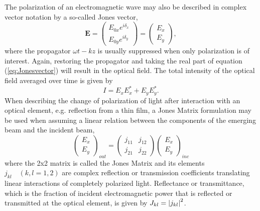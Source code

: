 The polarization of an electromagnetic wave may also be described in complex vector notation by a so-called Jones vector, 
\begin{equation}
    \mathbf{E} = 
    \begin{pmatrix}
        E_{0x}e^{i\delta_x} \\
        E_{0y}e^{i\delta_y} 
    \end{pmatrix}
    =
    \begin{pmatrix}
        E_{x} \\
        E_{y} 
    \end{pmatrix},
    \label{eq:Jonesvector}
\end{equation}
where the propagator $\omega t - kz$ is usually suppressed when only polarization is of interest\cite{collett}. Again, restoring the propagator and taking the real part of equation (\ref{eq:Jonesvector}) will result in the optical field. The total intensity of the optical field averaged over time is given by
\begin{equation}
    I = E_xE_x^* + E_yE_y^*.
\end{equation}
When describing the change of polarization of light after interaction with an optical element, e.g. reflection from a thin film, a Jones Matrix formulation may be used when assuming a linear relation between the components of the emerging beam and the incident beam,
\begin{equation}
    \begin{pmatrix}
        E_{x} \\
        E_{y} 
    \end{pmatrix}_{out}
    =
    \begin{pmatrix}
        j_{11} & j_{12} \\
        j_{21} & j_{22} 
    \end{pmatrix}
    \begin{pmatrix}
        E_{x} \\
        E_{y} 
    \end{pmatrix}_{inc}
\end{equation}
where the 2x2 matrix is called the Jones Matrix and its elements $j_{kl}\quad(k,l = 1,2)$ are complex reflection or transmission coefficients translating linear interactions of completely polarized light. Reflectance or transmittance, which is the fraction of incident electromagnetic power that is reflected or transmitted at the optical element, is given by $J_{kl} = \left| j_{kl} \right|^2$.

